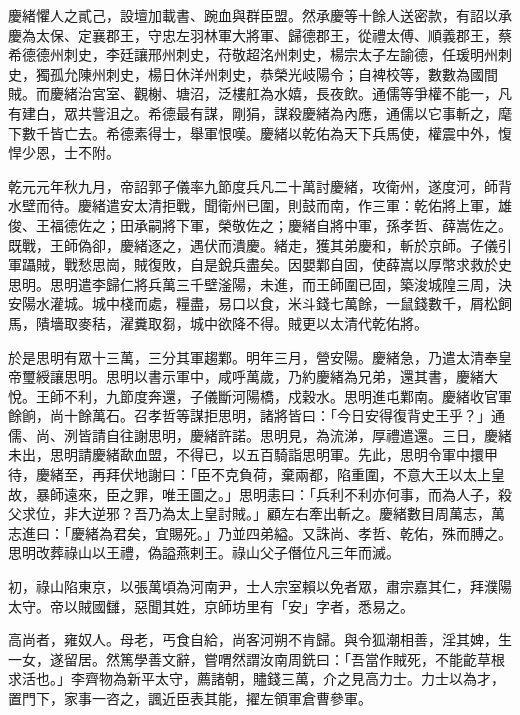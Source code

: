 \begin{pinyinscope}
 慶緒懼人之貳己，設壇加載書、踠血與群臣盟。然承慶等十餘人送密款，有詔以承慶為太保、定襄郡王，守忠左羽林軍大將軍、歸德郡王，從禮太傅、順義郡王，蔡希德德州刺史，李廷讓邢州刺史，苻敬超洺州刺史，楊宗太子左諭德，任瑗明州刺史，獨孤允陳州刺史，楊日休洋州刺史，恭榮光岐陽令；自裨校等，數數為國間賊。而慶緒治宮室、觀榭、塘沼，泛樓舡為水嬉，長夜飲。通儒等爭權不能一，凡有建白，眾共訾沮之。希德最有謀，剛狷，謀殺慶緒為內應，通儒以它事斬之，麾下數千皆亡去。希德素得士，舉軍恨嘆。慶緒以乾佑為天下兵馬使，權震中外，愎悍少恩，士不附。



 乾元元年秋九月，帝詔郭子儀率九節度兵凡二十萬討慶緒，攻衛州，遂度河，師背水壁而待。慶緒遣安太清拒戰，聞衛州已圍，則鼓而南，作三軍：乾佑將上軍，雄俊、王福德佐之；田承嗣將下軍，榮敬佐之；慶緒自將中軍，孫孝哲、薛嵩佐之。既戰，王師偽卻，慶緒逐之，遇伏而潰慶。緒走，獲其弟慶和，斬於京師。子儀引軍躡賊，戰愁思崗，賊復敗，自是銳兵盡矣。因嬰鄴自固，使薛嵩以厚幣求救於史思明。思明遣李歸仁將兵萬三千壁滏陽，未進，而王師圍已固，築浚城隍三周，決安陽水灌城。城中棧而處，糧盡，易口以食，米斗錢七萬餘，一鼠錢數千，屑松飼馬，隤墻取麥秸，濯糞取芻，城中欲降不得。賊更以太清代乾佑將。



 於是思明有眾十三萬，三分其軍趨鄴。明年三月，營安陽。慶緒急，乃遣太清奉皇帝璽綬讓思明。思明以書示軍中，咸呼萬歲，乃約慶緒為兄弟，還其書，慶緒大悅。王師不利，九節度奔還，子儀斷河陽橋，戍穀水。思明進屯鄴南。慶緒收官軍餘餉，尚十餘萬石。召孝哲等謀拒思明，諸將皆曰：「今日安得復背史王乎？」通儒、尚、洌皆請自往謝思明，慶緒許諾。思明見，為流涕，厚禮遣還。三日，慶緒未出，思明請慶緒歃血盟，不得已，以五百騎詣思明軍。先此，思明令軍中擐甲待，慶緒至，再拜伏地謝曰：「臣不克負荷，棄兩都，陷重圍，不意大王以太上皇故，暴師遠來，臣之罪，唯王圖之。」思明恚曰：「兵利不利亦何事，而為人子，殺父求位，非大逆邪？吾乃為太上皇討賊。」顧左右牽出斬之。慶緒數目周萬志，萬志進曰：「慶緒為君矣，宜賜死。」乃並四弟縊。又誅尚、孝哲、乾佑，殊而膊之。思明改葬祿山以王禮，偽謚燕剌王。祿山父子僭位凡三年而滅。



 初，祿山陷東京，以張萬頃為河南尹，士人宗室賴以免者眾，肅宗嘉其仁，拜濮陽太守。帝以賊國讎，惡聞其姓，京師坊里有「安」字者，悉易之。



 高尚者，雍奴人。母老，丐食自給，尚客河朔不肯歸。與令狐潮相善，淫其婢，生一女，遂留居。然篤學善文辭，嘗喟然謂汝南周銑曰：「吾當作賊死，不能齕草根求活也。」李齊物為新平太守，薦諸朝，贐錢三萬，介之見高力士。力士以為才，置門下，家事一咨之，諷近臣表其能，擢左領軍倉曹參軍。




\end{pinyinscope}
